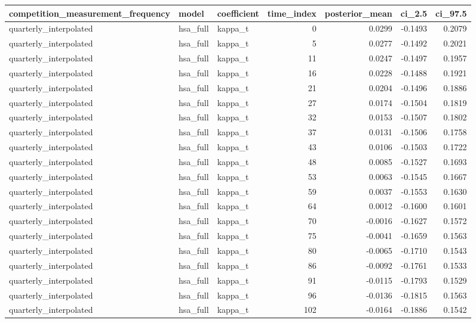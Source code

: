 \begin{tabular}{lllrrrr}
\toprule
competition\_measurement\_frequency & model & coefficient & time\_index & posterior\_mean & ci\_2.5 & ci\_97.5 \\
\midrule
quarterly\_interpolated & hsa\_full & kappa\_t & 0 & 0.0299 & -0.1493 & 0.2079 \\
quarterly\_interpolated & hsa\_full & kappa\_t & 5 & 0.0277 & -0.1492 & 0.2021 \\
quarterly\_interpolated & hsa\_full & kappa\_t & 11 & 0.0247 & -0.1497 & 0.1957 \\
quarterly\_interpolated & hsa\_full & kappa\_t & 16 & 0.0228 & -0.1488 & 0.1921 \\
quarterly\_interpolated & hsa\_full & kappa\_t & 21 & 0.0204 & -0.1496 & 0.1886 \\
quarterly\_interpolated & hsa\_full & kappa\_t & 27 & 0.0174 & -0.1504 & 0.1819 \\
quarterly\_interpolated & hsa\_full & kappa\_t & 32 & 0.0153 & -0.1507 & 0.1802 \\
quarterly\_interpolated & hsa\_full & kappa\_t & 37 & 0.0131 & -0.1506 & 0.1758 \\
quarterly\_interpolated & hsa\_full & kappa\_t & 43 & 0.0106 & -0.1503 & 0.1722 \\
quarterly\_interpolated & hsa\_full & kappa\_t & 48 & 0.0085 & -0.1527 & 0.1693 \\
quarterly\_interpolated & hsa\_full & kappa\_t & 53 & 0.0063 & -0.1545 & 0.1667 \\
quarterly\_interpolated & hsa\_full & kappa\_t & 59 & 0.0037 & -0.1553 & 0.1630 \\
quarterly\_interpolated & hsa\_full & kappa\_t & 64 & 0.0012 & -0.1600 & 0.1601 \\
quarterly\_interpolated & hsa\_full & kappa\_t & 70 & -0.0016 & -0.1627 & 0.1572 \\
quarterly\_interpolated & hsa\_full & kappa\_t & 75 & -0.0041 & -0.1659 & 0.1563 \\
quarterly\_interpolated & hsa\_full & kappa\_t & 80 & -0.0065 & -0.1710 & 0.1543 \\
quarterly\_interpolated & hsa\_full & kappa\_t & 86 & -0.0092 & -0.1761 & 0.1533 \\
quarterly\_interpolated & hsa\_full & kappa\_t & 91 & -0.0115 & -0.1793 & 0.1529 \\
quarterly\_interpolated & hsa\_full & kappa\_t & 96 & -0.0136 & -0.1815 & 0.1563 \\
quarterly\_interpolated & hsa\_full & kappa\_t & 102 & -0.0164 & -0.1886 & 0.1542 \\

\end{tabular}
